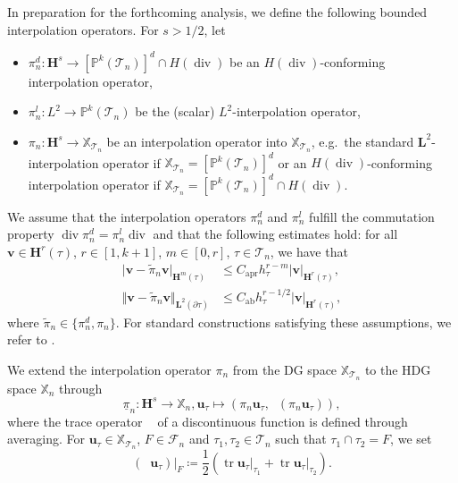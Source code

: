 \documentclass{m2an}
\renewcommand{\u}{\mathbf{u}}
\renewcommand{\v}{\mathbf{v}}
\renewcommand{\div}{\operatorname{div}}
\DeclareMathOperator{\tr}{\mathrm{tr}}
\DeclareMathOperator{\trF}{\mathrm{tr} \vert_{\Fn}}
\newcommand{\calT}{\mathcal{T}}
\newcommand{\X}{\mathbb{X}}
\newcommand{\Xn}{\mathbb{X}_n}
\newcommand{\XT}{\X_{\mathcal{T}_n}}
\newcommand{\bH}{{\mathbf H}}
\newcommand{\bL}{\mathbf{L}}
\newcommand{\Tn}{\calT_n}
\newcommand{\Fn}{\mathcal{F}_n}
\newcommand{\pinX}{\underline{\pi}_n}
\theoremstyle{plain}
\theoremstyle{definition}
\begin{document}
In preparation for the forthcoming analysis, we define the following bounded interpolation operators. For $s > 1/2$, let 
\begin{itemize}
   \item $\pi_n^d : \bH^s \to [\mathbb{P}^k(\Tn)]^d \cap H(\div)$ be an $H(\div)$-conforming interpolation operator, 
   \item $\pi_n^l : L^2 \to \mathbb{P}^k(\Tn)$ be the (scalar) $L^2$-interpolation operator, 
   \item $\pi_n : \bH^s \to \XT$ be an interpolation operator into $\XT$, e.g.~the standard $\bL^2$-interpolation operator if $\XT = [\mathbb{P}^k(\Tn)]^d$ or an $H(\div)$-conforming interpolation operator if $\XT = [\mathbb{P}^k(\Tn)]^d \cap H(\div)$.
\end{itemize}
We assume that the interpolation operators $\pi_n^d$ and $\pi_n^l$ fulfill the commutation property $\div \pi_n^d = \pi_n^l \div$ and that the following estimates hold:
for all $\v \in \bH^r(\tau)$, $r \in [1,k+1]$, $m \in [0,r]$, $\tau \in \Tn$, we have that
\begin{subequations}\label{eq:pi:approximationEstimates}
   \begin{align}
      \vert \v - \tilde{\pi}_n \v \vert_{\bH^m(\tau)} &\le C_{\text{apr}} h_{\tau}^{r-m} \vert \v \vert_{\bH^r(\tau)}, \\
      \Vert \v - \tilde{\pi}_n \v \Vert_{\bL^2(\partial \tau)} &\le C_{\text{ab}} h_{\tau}^{r-1/2} \vert \v \vert_{\bH^r(\tau)},
   \end{align}
\end{subequations}
where $\tilde{\pi}_n \in \{ \pi_n^d, \pi_n \}$. For standard constructions satisfying these assumptions, we refer to \cite{EG_FE1}.

We extend the interpolation operator $\pi_n$ from the DG space $\XT$ to the HDG space $\Xn$ through 
\begin{equation*}
   \pinX : \bH^s \to \Xn, \u_{\tau} \mapsto (\pi_n \u_{\tau}, \trF (\pi_n \u_{\tau})),
\end{equation*}
where the trace operator $\trF$ of a discontinuous function is defined through averaging. For $\u_{\tau} \in \XT$, $F \in \Fn$ and $\tau_{1},\tau_{2} \in \Tn$ such that $\tau_{1} \cap \tau_{2} = F$, we set 
\begin{equation*}
   ( \trF \u_{\tau}) \vert_F \coloneqq \frac{1}{2} ( \tr \u_{\tau} \vert_{\tau_1} + \tr \u_{\tau} \vert_{\tau_2}).
\end{equation*}
\end{document}
